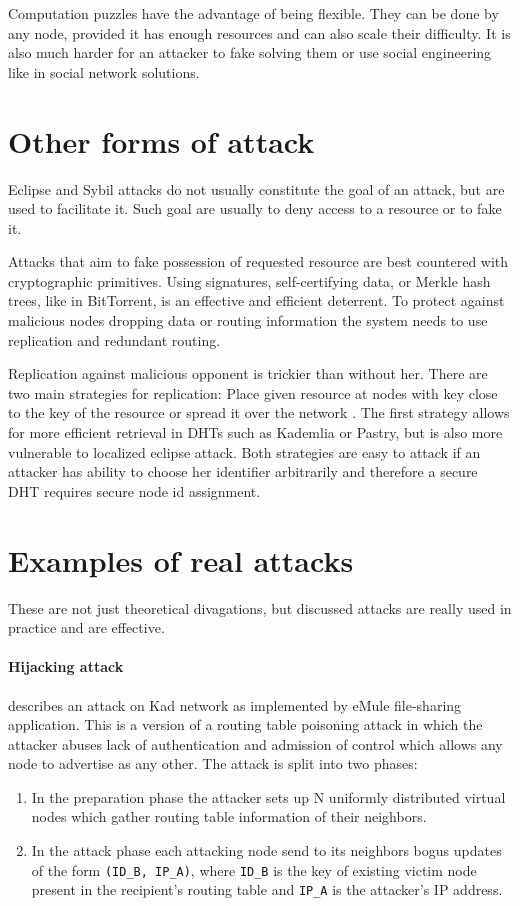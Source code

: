   Computation puzzles have the advantage of being flexible. They can be done by
  any node, provided it has enough resources and can also scale their
  difficulty. It is also much harder for an attacker to fake solving them or use
  social engineering like in social network solutions.

\section{Other forms of attack}
  Eclipse and Sybil attacks do not usually constitute the goal of an attack, but
  are used to facilitate it. Such goal are usually to deny access to a resource
  or to fake it.

  Attacks that aim to fake possession of requested resource are best countered
  with cryptographic primitives. Using signatures, self-certifying data, or
  Merkle hash trees, like in BitTorrent, is an effective and efficient
  deterrent. To protect against malicious nodes dropping data or routing
  information the system needs to use replication and redundant routing. 

  Replication against malicious opponent is trickier than without her. There are
  two main strategies for replication: Place given resource at nodes with key
  close to the key of the resource or spread it over the network \cite[p.
  38]{urd11}. The first strategy allows for more efficient retrieval in DHTs
  such as Kademlia or Pastry, but is also more vulnerable to localized eclipse
  attack. Both strategies are easy to attack if an attacker has ability to
  choose her identifier arbitrarily and therefore a secure DHT requires secure
  node id assignment.

\section{Examples of real attacks}
These are not just theoretical divagations, but discussed attacks are really
used in practice and are effective.

\paragraph{Hijacking attack}
\cite{wan08} describes an attack on Kad network as implemented by eMule
file-sharing application. This is a version of a routing table poisoning attack
in which the attacker abuses lack of authentication and admission of control
which allows any node to advertise as any other. The attack is split into two
phases:
\begin{enumerate}
  \item In the preparation phase the attacker sets up N uniformly distributed
    virtual nodes which gather routing table information of their neighbors.
  \item In the attack phase each attacking node send to its neighbors bogus
    updates of the form \texttt{(ID\_B, IP\_A)}, where \texttt{ID\_B} is the key
    of existing victim node present in the recipient's routing table and
    \texttt{IP\_A} is the attacker's IP address.
\end{enumerate}

